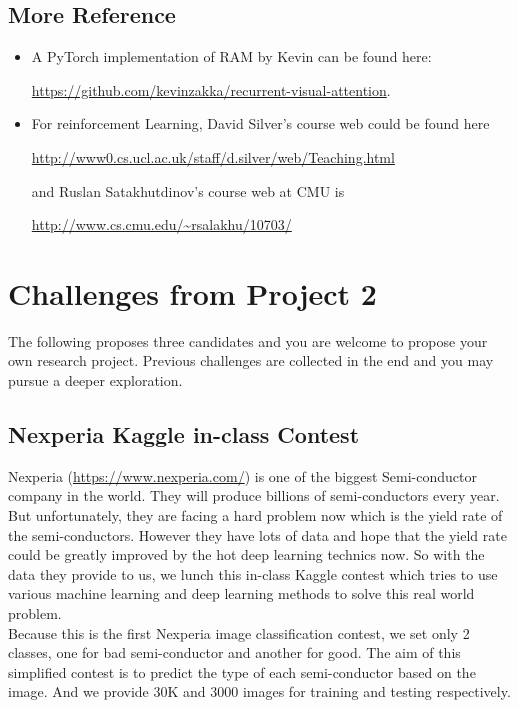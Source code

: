 \documentclass[11pt]{article}
\begin{document}
\subsection{More Reference}
\begin{itemize}
\item A PyTorch implementation of RAM by Kevin can be found here: 

\url{https://github.com/kevinzakka/recurrent-visual-attention}.
\item For reinforcement Learning, David Silver's course web could be found here 

\url{http://www0.cs.ucl.ac.uk/staff/d.silver/web/Teaching.html}

\noindent and Ruslan Satakhutdinov's course web at CMU is 

\url{http://www.cs.cmu.edu/~rsalakhu/10703/}
\end{itemize}



\section{Challenges from Project 2}
The following proposes three candidates and you are welcome to propose your own research project. Previous challenges are collected in the end and you may pursue a deeper exploration.

\subsection{Nexperia Kaggle in-class Contest}
Nexperia (\url{https://www.nexperia.com/}) is one of the biggest Semi-conductor company in the world. They will produce billions of semi-conductors every year. But unfortunately, they are facing a hard problem now which is the yield rate of the semi-conductors.
However they have lots of data and hope that the yield rate could be greatly improved by the hot deep learning technics now. So with the data they provide to us, we lunch this in-class Kaggle contest which tries to use various machine learning and deep learning methods to solve this real world problem.\\
Because this is the first Nexperia image classification contest, we set only 2 classes, one for bad semi-conductor and another for good. The aim of this simplified contest is to predict the type of each semi-conductor based on the image. And we provide 30K and 3000 images for training and testing respectively.\\
\end{document}
